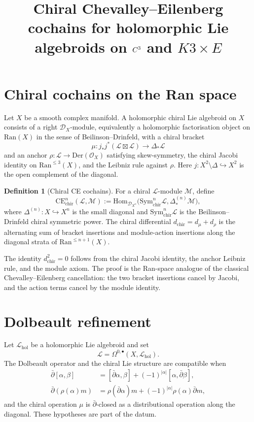 \documentclass[11pt]{amsart}
\title{Chiral Chevalley--Eilenberg cochains for holomorphic Lie
algebroids on $C^3$ and $K3 \times E$}
\author{}
\date{}
\providecommand{\dbar}{\bar{\partial}}
\providecommand{\Sym}{\mathrm{Sym}}
\providecommand{\CE}{\mathrm{CE}}
\providecommand{\chir}{\mathrm{chir}}
\providecommand{\Ran}{\mathrm{Ran}}
\providecommand{\Hom}{\mathrm{Hom}}
\providecommand{\cL}{\mathcal{L}}
\providecommand{\cM}{\mathcal{M}}
\providecommand{\cD}{\mathcal{D}}
\providecommand{\cO}{\mathcal{O}}
\theoremstyle{plain}
\theoremstyle{definition}
\newtheorem{definition}[theorem]{Definition}
\theoremstyle{remark}
\begin{document}
\maketitle

\section{Chiral cochains on the Ran space}
Let $X$ be a smooth complex manifold. A holomorphic chiral Lie algebroid
on $X$ consists of a right $\cD_X$-module, equivalently a holomorphic
factorisation object on $\Ran(X)$ in the sense of Beilinson--Drinfeld,
with a chiral bracket
\[
  \mu:j_*j^*(\cL\boxtimes\cL)\longrightarrow\Delta_*\cL
\]
and an anchor $\rho:\cL\to\mathrm{Der}(\cO_X)$ satisfying skew-symmetry,
the chiral Jacobi identity on $\Ran^{\leq3}(X)$, and the Leibniz rule
against $\rho$. Here $j:X^2\setminus\Delta\hookrightarrow X^2$ is the
open complement of the diagonal.

\begin{definition}[Chiral CE cochains]\label{def:chiral-ce-cochains}
For a chiral $\cL$-module $\cM$, define
\[
 \CE^n_{\chir}(\cL,\cM)
 :=
 \Hom_{\cD_{X^n}}\!\bigl(\Sym^n_{\chir}\cL,\Delta^{(n)}_*\cM\bigr),
\]
where $\Delta^{(n)}:X\hookrightarrow X^n$ is the small diagonal and
$\Sym^n_{\chir}\cL$ is the Beilinson--Drinfeld chiral symmetric power.
The chiral differential $d_{\chir}=d_\mu+d_\rho$ is the alternating sum
of bracket insertions and module-action insertions along the diagonal
strata of $\Ran^{\leq n+1}(X)$.
\end{definition}

The identity $d_{\chir}^2=0$ follows from the chiral Jacobi identity,
the anchor Leibniz rule, and the module axiom.
The proof is the Ran-space analogue of the classical
Chevalley--Eilenberg cancellation: the two bracket insertions cancel by
Jacobi, and the action terms cancel by the module identity.

\section{Dolbeault refinement}
Let $\cL_{\mathrm{hol}}$ be a holomorphic Lie algebroid and set
\[
  \cL=\Omega^{0,\bullet}(X,\cL_{\mathrm{hol}}).
\]
The Dolbeault operator and the chiral Lie structure are compatible when
\[
\begin{aligned}
  \dbar[\alpha,\beta]
  &=
  [\dbar\alpha,\beta]+(-1)^{|\alpha|}[\alpha,\dbar\beta],\\
  \dbar(\rho(\alpha)m)
  &=
  \rho(\dbar\alpha)m+(-1)^{|\alpha|}\rho(\alpha)\dbar m,
\end{aligned}
\]
and the chiral operation $\mu$ is $\dbar$-closed as a distributional
operation along the diagonal. These hypotheses are part of the datum.
\end{document}
